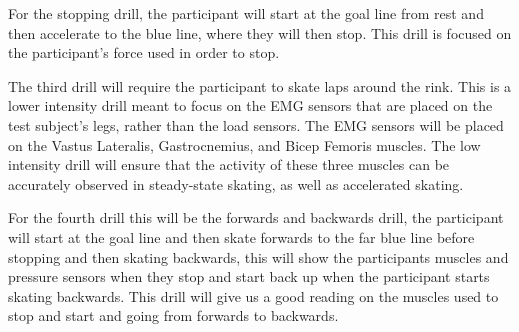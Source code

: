 For the stopping drill, the participant will start at the goal line from rest and then accelerate to the blue line, where they will then stop. This drill is focused on the participant's force used in order to stop. 

The third drill will require the participant to skate laps around the rink. This is a lower intensity drill meant to focus on the EMG sensors that are placed on the test subject's legs, rather than the load sensors. The EMG sensors will be placed on the Vastus Lateralis, Gastrocnemius, and Bicep Femoris muscles. The low intensity drill will ensure that the activity of these three muscles can be accurately observed in steady-state skating, as well as accelerated skating. 

For the fourth drill this will be the forwards and backwards drill, the participant will start at the goal line and then skate forwards to the far blue line before stopping and then skating backwards, this will show the participants muscles and pressure sensors when they stop and start back up when the participant starts skating backwards. This drill will give us a good reading on the muscles used to stop and start and going from forwards to backwards. 

